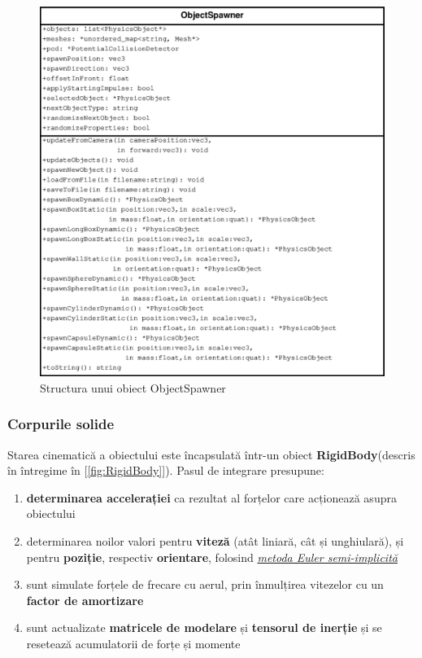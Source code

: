 \documentclass[12pt,a4paper]{report}
\begin{document}
\begin{figure}[H]
	\centering
	\includegraphics[width=0.9\linewidth]{pics/ObjectSpawner.eps}
	\caption[]{Structura unui obiect ObjectSpawner}
	\label{fig:ObjectSpawner}
\end{figure}

\subsubsection{Corpurile solide}
Starea cinematică a obiectului este încapsulată într-un obiect \textbf{RigidBody}(descris în întregime în [\autoref{fig:RigidBody}]). Pasul de integrare presupune:
\begin{enumerate}
	\item \textbf{determinarea accelerației} ca rezultat al forțelor care acționează asupra obiectului
	\item determinarea noilor valori pentru \textbf{viteză} (atât liniară, cât și unghiulară), și pentru \textbf{poziție}, respectiv \textbf{orientare}, folosind \hyperref[inline_implicit_euler]{\textit{metoda Euler semi-implicită}}
	\item sunt simulate forțele de frecare cu aerul, prin înmulțirea vitezelor cu un \textbf{factor de amortizare}
	\item sunt actualizate \textbf{matricele de modelare} și \textbf{tensorul de inerție} și se resetează acumulatorii de forțe și momente 
\end{enumerate}
\end{document}
